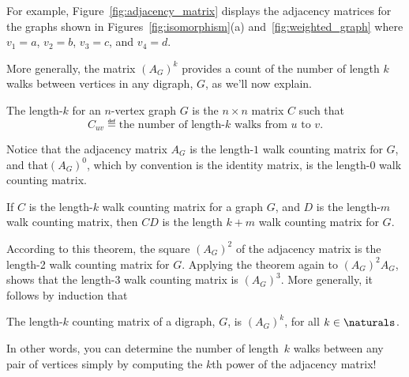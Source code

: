 For example, Figure~\ref{fig:adjacency_matrix} displays the adjacency
matrices for the graphs shown in Figures~\ref{fig:isomorphism}(a)
and~\ref{fig:weighted_graph} where $v_1 = a$, $v_2 = b$, $v_3 = c$,
and $v_4 = d$.
\fi

More generally, the matrix $(A_G)^k$ provides a count of the number of
length $k$ walks between vertices in any digraph, $G$, as we'll now
explain.

\begin{definition}
  The length-$k$  for an $n$-vertex graph $G$
  is the $n \times n$ matrix $C$ such that
\begin{equation}\label{def:walk_matrix}
C_{uv} \eqdef \text{the number of length-$k$ walks from $u$ to $v$}.
\end{equation}
\end{definition}
Notice that the adjacency matrix $A_G$ is the length-$1$ walk counting
matrix for $G$, and that$(A_G)^0$, which by convention is the identity
matrix, is the length-0 walk counting matrix.

\begin{theorem}\label{thm:CkDm}
 If $C$ is the length-$k$ walk counting matrix for a graph $G$, and
 $D$ is the length-$m$ walk counting matrix, then $CD$ is the length
 $k+m$ walk counting matrix for $G$.
\end{theorem}

According to this theorem, the square $(A_G)^2$ of the adjacency
matrix is the length-2 walk counting matrix for $G$.  Applying the
theorem again to $(A_G)^2A_G$, shows that the length-3 walk counting
matrix is $(A_G)^3$.  More generally, it follows by induction that
\begin{corollary}\label{AGklenk}
The length-$k$ counting matrix of a digraph, $G$, is $(A_G)^k$, for
all $k \in \naturals$.
\end{corollary}
In other words, you can determine the number of length~$k$ walks
between any pair of vertices simply by computing the $k$th power of
the adjacency matrix!   \iffalse


